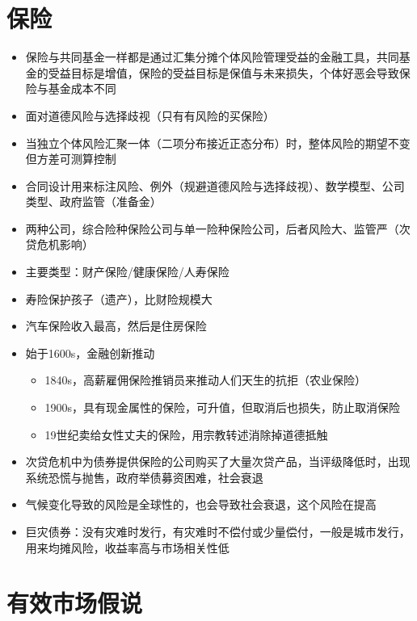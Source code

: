 \documentclass[
]{book}
\providecommand{\tightlist}{%
  \setlength{\itemsep}{0pt}\setlength{\parskip}{0pt}}
\begin{document}
\hypertarget{ux4fddux9669}{%
\section{保险}\label{ux4fddux9669}}

\begin{itemize}
\tightlist
\item
  保险与共同基金一样都是通过汇集分摊个体风险管理受益的金融工具，共同基金的受益目标是增值，保险的受益目标是保值与未来损失，个体好恶会导致保险与基金成本不同
\item
  面对道德风险与选择歧视（只有有风险的买保险）
\item
  当独立个体风险汇聚一体（二项分布接近正态分布）时，整体风险的期望不变但方差可测算控制
\item
  合同设计用来标注风险、例外（规避道德风险与选择歧视）、数学模型、公司类型、政府监管（准备金）
\item
  两种公司，综合险种保险公司与单一险种保险公司，后者风险大、监管严（次贷危机影响）
\item
  主要类型：财产保险/健康保险/人寿保险
\item
  寿险保护孩子（遗产），比财险规模大
\item
  汽车保险收入最高，然后是住房保险
\item
  始于1600s，金融创新推动

  \begin{itemize}
  \tightlist
  \item
    1840s，高薪雇佣保险推销员来推动人们天生的抗拒（农业保险）
  \item
    1900s，具有现金属性的保险，可升值，但取消后也损失，防止取消保险
  \item
    19世纪卖给女性丈夫的保险，用宗教转述消除掉道德抵触
  \end{itemize}
\item
  次贷危机中为债券提供保险的公司购买了大量次贷产品，当评级降低时，出现系统恐慌与抛售，政府举债募资困难，社会衰退
\item
  气候变化导致的风险是全球性的，也会导致社会衰退，这个风险在提高
\item
  巨灾债券：没有灾难时发行，有灾难时不偿付或少量偿付，一般是城市发行，用来均摊风险，收益率高与市场相关性低
\end{itemize}

\hypertarget{ux6709ux6548ux5e02ux573aux5047ux8bf4}{%
\section{有效市场假说}\label{ux6709ux6548ux5e02ux573aux5047ux8bf4}}
\end{document}
